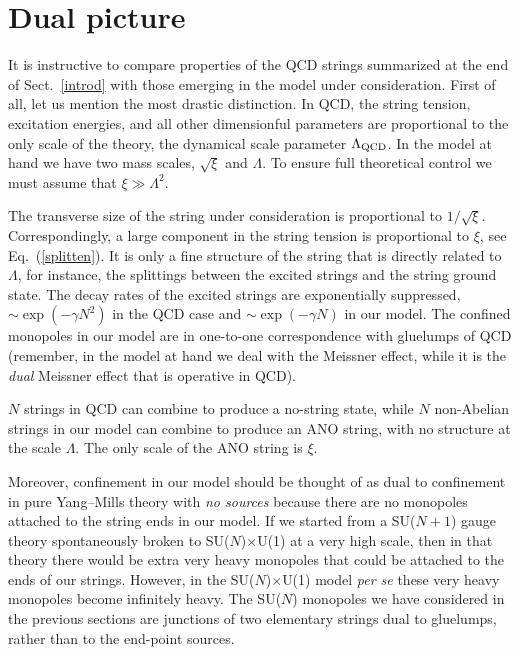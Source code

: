 \section{Dual picture}
\label{dupi}

It is instructive to compare properties of the QCD strings 
summarized at the end
of Sect.~\ref{introd} with those emerging in the model under 
consideration.
First of all, let us mention the most drastic distinction.
In QCD, the string tension, excitation energies, and all other
dimensionful parameters are proportional to the only scale of the 
theory,
the dynamical scale parameter $\Lambda_{\rm QCD}$. In the model at hand we have two
mass scales, $\sqrt\xi$ and $\Lambda$. To ensure full theoretical 
control we must assume that $\xi \gg \Lambda^2$.

The transverse size of the string under consideration
is proportional to $1/\sqrt\xi$. Correspondingly, a large component
in the string tension is proportional to $\xi$, see Eq.~(\ref{splitten}). 
It is only a fine structure
of the string that is directly related to $\Lambda$,
for instance, the splittings between the excited strings and
the string ground state. The decay rates of the excited strings
are exponentially suppressed,   $\sim \exp(-\gamma N^2)$ 
in the QCD case and $\sim \exp(-\gamma N )$  
in our model. The confined monopoles in our model
are in one-to-one correspondence with gluelumps of QCD
(remember, in the model at hand we deal with the Meissner effect, while
it is the {\em dual} Meissner effect that is operative in QCD).

$N$ strings in QCD can combine to produce a no-string state,
while $N$ non-Abelian strings in our model can combine to produce an 
ANO string,
with no structure at the scale $\Lambda$. The only scale of the ANO
string is $\xi$.

Moreover, confinement in our model should be thought of
as dual to  confinement in pure Yang--Mills theory with {\em no sources}
because there are no
monopoles attached to  the string ends  in our model. If we started 
from a
SU($N+1$) gauge theory spontaneously broken to
SU($N$)$\times$U(1) at a very high scale,
then in that theory there would be extra very heavy monopoles
that could be attached to the ends of
our strings. However, in the SU($N$)$\times$U(1) model {\em per se}
these very heavy monopoles  become
infinitely heavy. The SU($N$) monopoles we have considered in the 
previous
sections  are junctions of  two elementary
strings   dual to gluelumps, rather than to the end-point sources.


